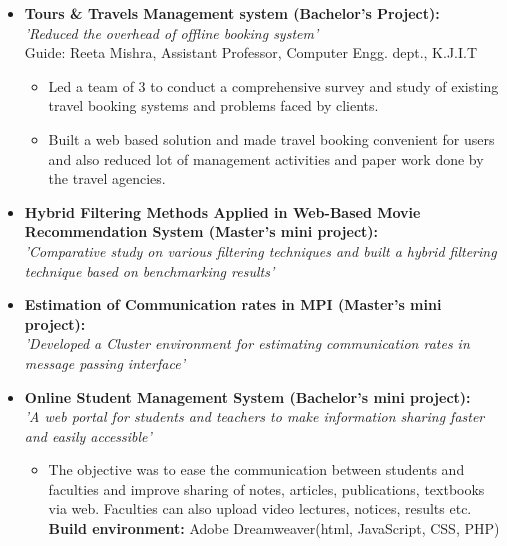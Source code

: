 \documentclass[11pt,letterpaper,sans]{moderncv}        %
\begin{document}
\begin{itemize}
\item{\textbf{Tours \& Travels Management system (Bachelor's Project):}
\\ \textit{'Reduced the overhead of offline booking system'}
\\ Guide: Reeta Mishra, Assistant Professor, Computer Engg. dept., K.J.I.T
\vspace{1pt}
\small{
\begin{itemize}
\item Led a team of 3 to conduct a comprehensive survey and study of existing travel booking systems and problems faced by clients.
\vspace{1pt}
\item Built a web based solution and made travel booking convenient for users and also reduced lot of management activities and paper work done by the travel agencies.
\end{itemize}}}

\vspace{5pt}

\item{\textbf{Hybrid Filtering Methods Applied in Web-Based Movie Recommendation System (Master's mini project):}
\\ \textit{'Comparative study on various filtering techniques and built a hybrid filtering technique based on benchmarking results'}}

\vspace{5pt}

\item{\textbf{Estimation of Communication rates in MPI (Master's mini project):}
\\ \textit{'Developed a Cluster environment for estimating communication rates in message passing interface'}}

\vspace{5pt}

\item{\textbf{Online Student Management System (Bachelor's mini project):}
\\ \textit{'A web portal for students and teachers to make information sharing faster and easily accessible'}

\vspace{1pt}

\small{
\begin{itemize}
\item The objective was to ease the communication between students and faculties and improve sharing of notes, articles, publications, textbooks via web. Faculties can also upload video lectures, notices, results etc.
\\ \textbf{Build environment:} Adobe Dreamweaver(html, JavaScript, CSS, PHP)
\end{itemize}}}

\end{itemize}
\end{document}
